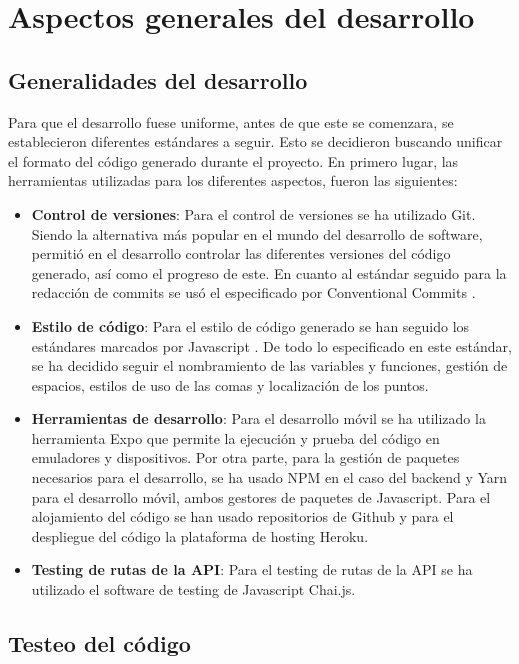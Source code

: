 \section{Aspectos generales del desarrollo}

\subsection{Generalidades del desarrollo}

Para que el desarrollo fuese uniforme, antes de que este se comenzara, se establecieron diferentes estándares a seguir. Esto se decidieron buscando unificar el formato del código generado durante el proyecto. En primero lugar, las herramientas utilizadas para los diferentes aspectos, fueron las siguientes:

\begin{itemize}
    \item \textbf{Control de versiones}: Para el control de versiones se ha utilizado Git. Siendo la alternativa más popular en el mundo del desarrollo de software, permitió en el desarrollo controlar las diferentes versiones del código generado, así como el progreso de este. En cuanto al estándar seguido para la redacción de commits se usó el especificado por Conventional Commits \cite{standardgit}.
    \item \textbf{Estilo de código}: Para el estilo de código generado se han seguido los estándares marcados por Javascript \cite{standardjs}. De todo lo especificado en este estándar, se ha decidido seguir el nombramiento de las variables y funciones, gestión de espacios, estilos de uso de las comas y localización de los puntos.
    \item \textbf{Herramientas de desarrollo}: Para el desarrollo móvil se ha utilizado la herramienta Expo que permite la ejecución y prueba del código en emuladores y dispositivos. Por otra parte, para la gestión de paquetes necesarios para el desarrollo, se ha usado NPM en el caso del backend y Yarn para el desarrollo móvil, ambos gestores de paquetes de Javascript. Para el alojamiento del código se han usado repositorios de Github y para el despliegue del código la plataforma de hosting Heroku.
    \item \textbf{Testing de rutas de la API}: Para el testing de rutas de la API se ha utilizado el software de testing de Javascript Chai.js.
\end{itemize}

\subsection{Testeo del código}

